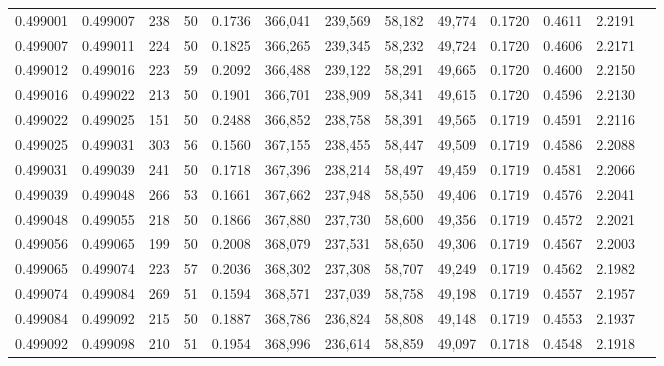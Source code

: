 \begin{tabular}{rrrrrrrrrrrrr}
0.499001 & 0.499007 & 238 &  50 &                                     0.1736 & 366,041 & 239,569 &  58,182 &  49,774 & 0.1720 & 0.4611 & 2.2191 \\
0.499007 & 0.499011 & 224 &  50 &                                     0.1825 & 366,265 & 239,345 &  58,232 &  49,724 & 0.1720 & 0.4606 & 2.2171 \\
0.499012 & 0.499016 & 223 &  59 &                                     0.2092 & 366,488 & 239,122 &  58,291 &  49,665 & 0.1720 & 0.4600 & 2.2150 \\
0.499016 & 0.499022 & 213 &  50 &                                     0.1901 & 366,701 & 238,909 &  58,341 &  49,615 & 0.1720 & 0.4596 & 2.2130 \\
0.499022 & 0.499025 & 151 &  50 &                                     0.2488 & 366,852 & 238,758 &  58,391 &  49,565 & 0.1719 & 0.4591 & 2.2116 \\
0.499025 & 0.499031 & 303 &  56 &                                     0.1560 & 367,155 & 238,455 &  58,447 &  49,509 & 0.1719 & 0.4586 & 2.2088 \\
0.499031 & 0.499039 & 241 &  50 &                                     0.1718 & 367,396 & 238,214 &  58,497 &  49,459 & 0.1719 & 0.4581 & 2.2066 \\
0.499039 & 0.499048 & 266 &  53 &                                     0.1661 & 367,662 & 237,948 &  58,550 &  49,406 & 0.1719 & 0.4576 & 2.2041 \\
0.499048 & 0.499055 & 218 &  50 &                                     0.1866 & 367,880 & 237,730 &  58,600 &  49,356 & 0.1719 & 0.4572 & 2.2021 \\
0.499056 & 0.499065 & 199 &  50 &                                     0.2008 & 368,079 & 237,531 &  58,650 &  49,306 & 0.1719 & 0.4567 & 2.2003 \\
0.499065 & 0.499074 & 223 &  57 &                                     0.2036 & 368,302 & 237,308 &  58,707 &  49,249 & 0.1719 & 0.4562 & 2.1982 \\
0.499074 & 0.499084 & 269 &  51 &                                     0.1594 & 368,571 & 237,039 &  58,758 &  49,198 & 0.1719 & 0.4557 & 2.1957 \\
0.499084 & 0.499092 & 215 &  50 &                                     0.1887 & 368,786 & 236,824 &  58,808 &  49,148 & 0.1719 & 0.4553 & 2.1937 \\
0.499092 & 0.499098 & 210 &  51 &                                     0.1954 & 368,996 & 236,614 &  58,859 &  49,097 & 0.1718 & 0.4548 & 2.1918 \\

\end{tabular}
